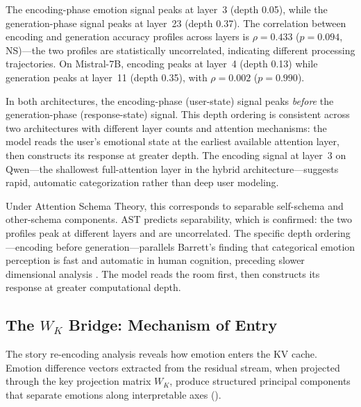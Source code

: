 \documentclass[11pt,a4paper]{article}
\begin{document}
The encoding-phase emotion signal peaks at layer~3 (depth 0.05), while the generation-phase signal peaks at layer~23 (depth 0.37). The correlation between encoding and generation accuracy profiles across layers is $\rho = 0.433$ ($p = 0.094$, NS)---the two profiles are statistically uncorrelated, indicating different processing trajectories. On Mistral-7B, encoding peaks at layer~4 (depth 0.13) while generation peaks at layer~11 (depth 0.35), with $\rho = 0.002$ ($p = 0.990$).

In both architectures, the encoding-phase (user-state) signal peaks \emph{before} the generation-phase (response-state) signal. This depth ordering is consistent across two architectures with different layer counts and attention mechanisms: the model reads the user's emotional state at the earliest available attention layer, then constructs its response at greater depth. The encoding signal at layer~3 on Qwen---the shallowest full-attention layer in the hybrid architecture---suggests rapid, automatic categorization rather than deep user modeling.

Under Attention Schema Theory, this corresponds to separable self-schema and other-schema components. AST predicts separability, which is confirmed: the two profiles peak at different layers and are uncorrelated. The specific depth ordering---encoding before generation---parallels Barrett's finding that categorical emotion perception is fast and automatic in human cognition, preceding slower dimensional analysis \citep{barrett2006solving}. The model reads the room first, then constructs its response at greater computational depth.

\subsection{The $W_K$ Bridge: Mechanism of Entry}

The story re-encoding analysis reveals how emotion enters the KV cache. Emotion difference vectors extracted from the residual stream, when projected through the key projection matrix $W_K$, produce structured principal components that separate emotions along interpretable axes ().
\end{document}
